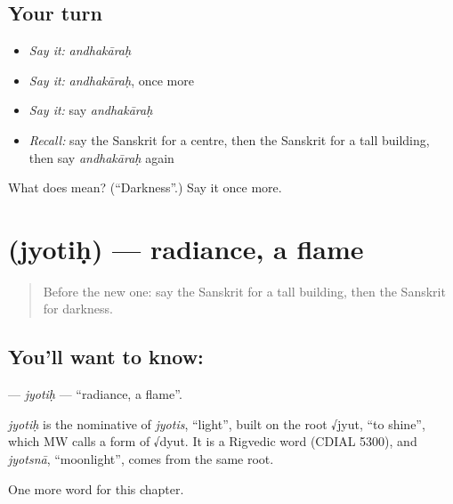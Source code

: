\subsection*{Your turn}
\begin{itemize}
\raggedright
  \item \emph{Say it:} \emph{andhakāraḥ}
  \item \emph{Say it:} \emph{andhakāraḥ}, once more
  \item \emph{Say it:} say \emph{andhakāraḥ}
  \item \emph{Recall:} say the Sanskrit for a centre, then the Sanskrit for a tall building, then say \emph{andhakāraḥ} again
\end{itemize}

\begin{tcolorbox}[breakable,colback=teal!4,colframe=teal!35!black,title={Before you move on}]
What does  mean? (\textquotedblleft{}Darkness\textquotedblright{}.) Say it once more.
\end{tcolorbox}
\section[\texorpdfstring{\sk{ज्योतिः} (jyotiḥ)}{ज्योतिः (jyotiḥ)}]{ (jyotiḥ) — radiance, a flame}

\label{lesson:SA-C224-jyotih}



\begin{quote}
Before the new one: say the Sanskrit for a tall building, then the Sanskrit for darkness.
\end{quote}

\subsection*{You'll want to know: }
\textbf{} — \emph{jyotiḥ} — \textquotedblleft{}radiance, a flame\textquotedblright{}.

\begin{cousinweb}
\emph{jyotiḥ} is the nominative of \emph{jyotis}, \textquotedblleft{}light\textquotedblright{}, built on the root √jyut, \textquotedblleft{}to shine\textquotedblright{}, which MW calls a form of √dyut. It is a Rigvedic word (CDIAL 5300), and \emph{jyotsnā}, \textquotedblleft{}moonlight\textquotedblright{}, comes from the same root.
\end{cousinweb}

\begin{grammarlens}[title={What you've built}]
One more word for this chapter.
\end{grammarlens}

